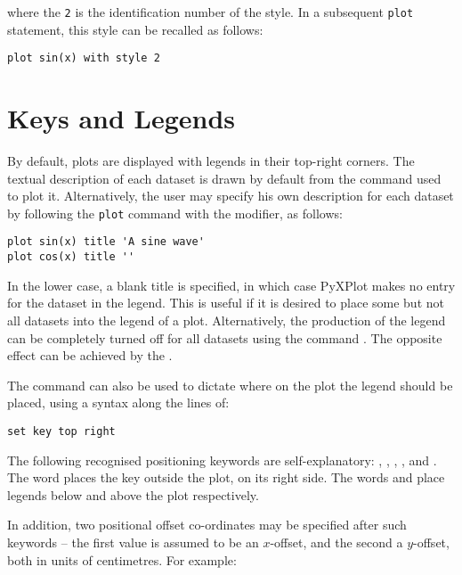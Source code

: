 \noindent where the {\tt 2} is the identification number of the style. In a
subsequent {\tt plot} statement, this style can be recalled as follows:

\begin{verbatim}
plot sin(x) with style 2
\end{verbatim}

\section{Keys and Legends}
\label{sec:legends}

By default, plots are displayed with legends in their top-right corners. The
textual description of each dataset is drawn by default from the command used
to plot it. Alternatively, the user may specify his own description for each
dataset by following the {\tt plot} command with the  modifier,
as follows:

\begin{verbatim}
plot sin(x) title 'A sine wave'
plot cos(x) title ''
\end{verbatim}

In the lower case, a blank title is specified, in which case PyXPlot makes no
entry for the dataset in the legend. This is useful if it is desired to place
some but not all datasets into the legend of a plot.  Alternatively, the
production of the legend can be completely turned off for all datasets using
the command . The opposite effect can be achieved by the
.

The  command can also be used to dictate where on the plot the
legend should be placed, using a syntax along the lines of:

\begin{verbatim}
set key top right
\end{verbatim}

The following recognised positioning keywords are self-explanatory:
, , , ,
 and . The word  places the
key outside the plot, on its right side. The words  and
 place legends below and above the plot respectively.

In addition, two positional offset co-ordinates may be specified after such
keywords -- the first value is assumed to be an $x$-offset, and the second a
$y$-offset, both in units of centimetres. For example:

